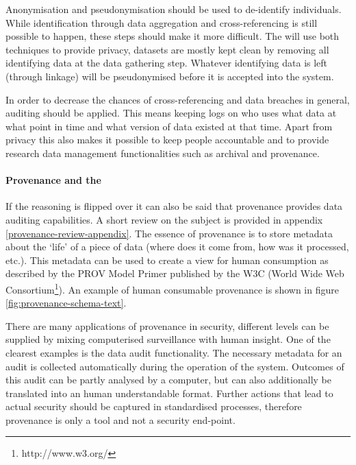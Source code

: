 Anonymisation and pseudonymisation should be used to de-identify individuals.
While identification through data aggregation and cross-referencing is still possible to happen, these steps should make it more difficult.
The \ivfsystem{} will use both techniques to provide privacy, datasets are mostly kept clean by removing all identifying data at the data gathering step.
Whatever identifying data is left (through linkage) will be pseudonymised before it is accepted into the system.

In order to decrease the chances of cross-referencing and data breaches in general, auditing should be applied.
This means keeping logs on who uses what data at what point in time and what version of data existed at that time.
Apart from privacy this also makes it possible to keep people accountable and to provide research data management functionalities such as archival and provenance.

\paragraph{Provenance and the \ivfsystem{}}
If the reasoning is flipped over it can also be said that provenance provides data auditing capabilities.
A short review on the subject is provided in appendix \ref{provenance-review-appendix}.
The essence of provenance is to store metadata about the `life' of a piece of data (where does it come from, how was it processed, etc.).
This metadata can be used to create a view for human consumption as described by the PROV Model Primer \cite{dsp8gil} published by the W3C (World Wide Web Consortium\footnote{http://www.w3.org/}).
An example of human consumable provenance is shown in figure \ref{fig:provenance-schema-text}.

There are many applications of provenance in security, different levels can be supplied by mixing computerised surveillance with human insight.
One of the clearest examples is the data audit functionality.
The necessary metadata for an audit is collected automatically during the operation of the system.
Outcomes of this audit can be partly analysed by a computer, but can also additionally be translated into an human understandable format.
Further actions that lead to actual security should be captured in standardised processes, therefore provenance is only a tool and not a security end-point.

